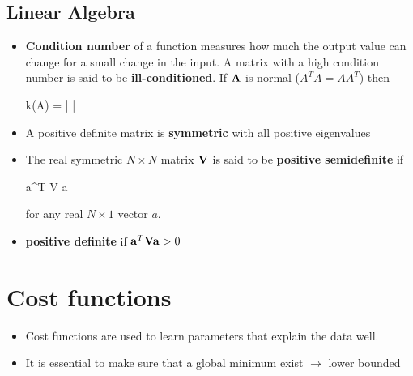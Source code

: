 
\subsection{Linear Algebra}
\begin{itemize}




\item \textbf{Condition number} of a function measures how much the output value can change for a small change in the input. A matrix with a high condition number is said to be \textbf{ill-conditioned}. If $\mathbf{A}$ is normal ($A^T A = A A^T$) then
\begin{myalign*}
    k(\*A) = 
    \left|
    \right|
\end{myalign*}

\item A positive definite matrix is \textbf{symmetric} with all positive eigenvalues
\item The real symmetric $N \times N$ matrix $\mathbf{V}$ is said to be \textbf{positive semidefinite} if 
\begin{myalign*}
    \*a^T \*V \*a 
\end{myalign*}
for any real $N \times 1$ vector $a$.
\item \textbf{positive definite} if $\mathbf{a}^T \mathbf{V} \mathbf{a} > 0$

\end{itemize}

\section{Cost functions}
\begin{itemize}
    \item Cost functions are used to learn parameters that explain the data well.
    \item It is essential to make sure that a global minimum exist $\rightarrow$ lower bounded
\end{itemize}

